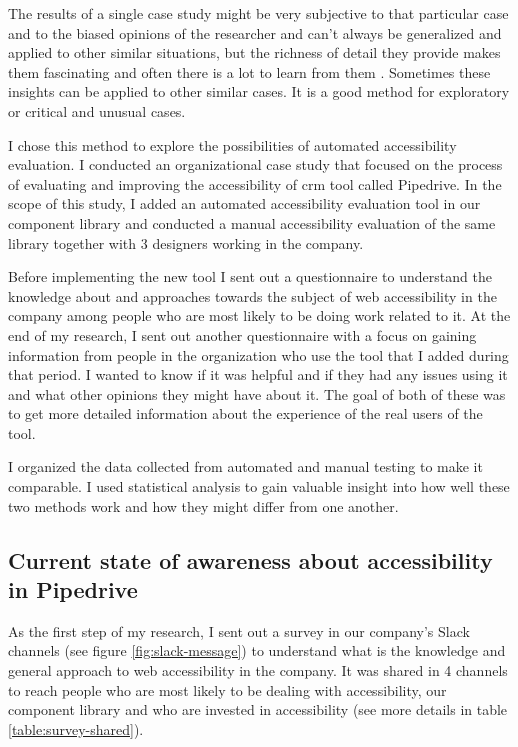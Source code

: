 \documentclass{master_thesis}
\begin{document}
The results of a single case study might be very subjective to that particular case and to the biased opinions of the researcher and can't always be generalized and applied to other similar situations, but the richness of detail they provide makes them fascinating and often there is a lot to learn from them \citep{Range2023}. Sometimes these insights can be applied to other similar cases. It is a good method for exploratory or critical and unusual cases.

I chose this method to explore the possibilities of automated accessibility evaluation. I conducted an organizational case study that focused on the process of evaluating and improving the accessibility of \ac{crm} tool called Pipedrive. In the scope of this study, I added an automated accessibility evaluation tool in our component library and conducted a manual accessibility evaluation of the same library together with 3 designers working in the company.

Before implementing the new tool I sent out a questionnaire to understand the knowledge about and approaches towards the subject of web accessibility in the company among people who are most likely to be doing work related to it. At the end of my research, I sent out another questionnaire with a focus on gaining information from people in the organization who use the tool that I added during that period. I wanted to know if it was helpful and if they had any issues using it and what other opinions they might have about it. The goal of both of these was to get more detailed information about the experience of the real users of the tool.

I organized the data collected from automated and manual testing to make it comparable. I used statistical analysis to gain valuable insight into how well these two methods work and how they might differ from one another.

\subsection{Current state of awareness about accessibility in Pipedrive}

As the first step of my research, I sent out a survey in our company's Slack channels (see figure \ref{fig:slack-message}) to understand what is the knowledge and general approach to web accessibility in the company. It was shared in 4 channels to reach people who are most likely to be dealing with accessibility, our component library and who are invested in accessibility (see more details in table \ref{table:survey-shared}).
\end{document}
